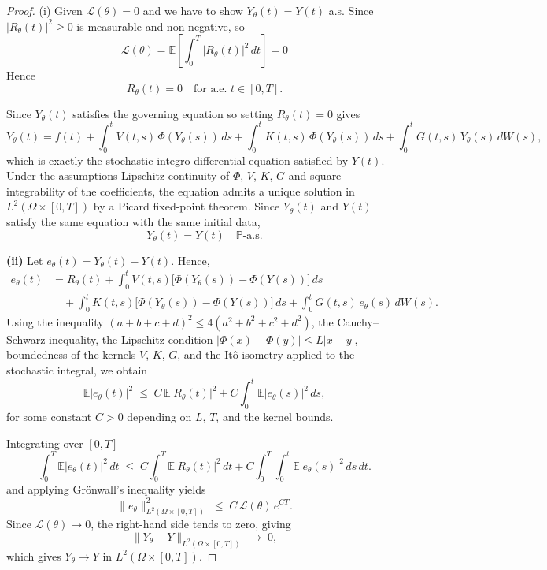 \documentclass[preprint,12pt,authoryear]{elsarticle}
\begin{document}
\begin{proof}
(i) Given $\mathcal{L}(\theta) = 0$ and we have to show $Y_\theta(t) = Y(t)$ a.s.
 Since $|R_\theta(t)|^2 \geq 0$ is measurable and non-negative, so
\[
\mathcal{L}(\theta) = \mathbb{E}\!\left[\int_0^T |R_\theta(t)|^2\,dt\right] = 0
\]
Hence
\[
R_\theta(t) = 0 \quad \text{for a.e. } t \in [0,T].
\]
 
Since $Y_\theta(t)$ satisfies the governing equation so setting $R_\theta(t) = 0$ gives
\[
Y_\theta(t) = f(t)
  + \int_0^t V(t,s)\,\Phi(Y_\theta(s))\,ds
  + \int_0^t K(t,s)\,\Phi(Y_\theta(s))\,ds
  + \int_0^t G(t,s)\,Y_\theta(s)\,dW(s),
\]
which is exactly the stochastic integro-differential equation satisfied by $Y(t)$.
Under the assumptions Lipschitz continuity of $\Phi$, $V$, $K$, $G$ and square-integrability of the coefficients, the equation admits a unique solution in $L^2(\Omega \times [0,T])$ by a Picard fixed-point theorem. Since $Y_\theta(t)$ and $Y(t)$ satisfy the same equation with the same initial data,
\[
Y_\theta(t) = Y(t) \quad \mathbb{P}\text{-a.s.}
\]
 
\bigskip
\textbf{(ii)}
Let $e_\theta(t) = Y_\theta(t) - Y(t)$. Hence, 
\begin{align*}
e_\theta(t) &= R_\theta(t)
  + \int_0^t V(t,s)\bigl[\Phi(Y_\theta(s)) - \Phi(Y(s))\bigr]\,ds \\
  &\quad + \int_0^t K(t,s)\bigl[\Phi(Y_\theta(s)) - \Phi(Y(s))\bigr]\,ds
  + \int_0^t G(t,s)\,e_\theta(s)\,dW(s).
\end{align*}
Using the inequality $(a+b+c+d)^2 \leq 4(a^2+b^2+c^2+d^2)$, the Cauchy--Schwarz inequality, the Lipschitz condition $|\Phi(x)-\Phi(y)| \leq L|x-y|$, boundedness of the kernels $V$, $K$, $G$, and the {It\^{o} isometry} applied to the stochastic integral, we obtain
\[
\mathbb{E}|e_\theta(t)|^2
\;\leq\; C\,\mathbb{E}|R_\theta(t)|^2 + C\int_0^t \mathbb{E}|e_\theta(s)|^2\,ds,
\]
for some constant $C > 0$ depending on $L$, $T$, and the kernel bounds.
 
Integrating over $[0,T]$
\[
\int_0^T \mathbb{E}|e_\theta(t)|^2\,dt
\;\leq\; C\int_0^T \mathbb{E}|R_\theta(t)|^2\,dt
  + C\int_0^T\!\int_0^t \mathbb{E}|e_\theta(s)|^2\,ds\,dt.
\]
and applying {Gr\"{o}nwall's inequality} yields
\[
\|e_\theta\|^2_{L^2(\Omega\times[0,T])}
\;\leq\; C\,\mathcal{L}(\theta)\,e^{CT}.
\]
Since $\mathcal{L}(\theta) \to 0$, the right-hand side tends to zero, giving
\[
\|Y_\theta - Y\|_{L^2(\Omega\times[0,T])} \;\longrightarrow\; 0,
\]
which gives $Y_\theta \to Y$ in $L^2(\Omega \times [0,T])$.
\end{proof}
\end{document}
